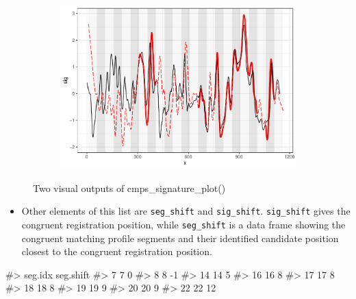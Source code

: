 \begin{figure}[hbt]
\begin{subfigure}[t]{\textwidth}
\begin{adjustbox}{valign=t}
\begin{minipage}{.39\textwidth}
{\small {}
\begin{Schunk}
\end{Schunk}
}
\vspace{1em}
\end{minipage}
\begin{minipage}{.59\textwidth}
\includegraphics[width=\textwidth]{ju-hofmann_files/figure-latex/sigplot2-1.pdf}
\end{minipage}
\end{adjustbox}
\end{subfigure}
\caption{\label{fig:sigplots} Two visual outputs of cmps\_signature\_plot()}
\end{figure}

\begin{itemize}
\tightlist
\item
  Other elements of this list are \texttt{seg\_shift} and
  \texttt{sig\_shift}. \texttt{sig\_shift} gives the congruent
  registration position, while \texttt{seg\_shift} is a data frame
  showing the congruent matching profile segments and their identified
  candidate position closest to the congruent registration position.
\end{itemize}

\begin{Schunk}
\begin{Soutput}
#>    seg.idx seg.shift
#> 7        7         0
#> 8        8        -1
#> 14      14         5
#> 16      16         8
#> 17      17         8
#> 18      18         8
#> 19      19         9
#> 20      20         9
#> 22      22        12
\end{Soutput}
\end{Schunk}


